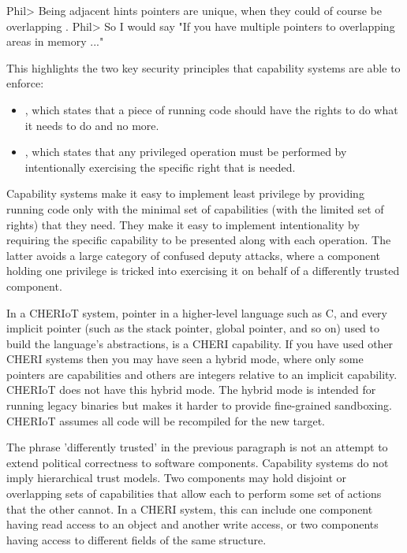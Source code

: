 Phil> Being adjacent hints pointers are unique, when they could of course be overlapping .
Phil> So I would say "If you have multiple pointers to overlapping areas in memory ..."  

This highlights the two key security principles that capability systems are able to enforce:

\begin{itemize}
	\item{, which states that a piece of running code should have the rights to do what it needs to do and no more.}
	\item{, which states that any privileged operation must be performed by intentionally exercising the specific right that is needed.}
\end{itemize}

Capability systems make it easy to implement least privilege by providing running code only with the minimal set of capabilities (with the limited set of rights) that they need.
They make it easy to implement intentionality by requiring the specific capability to be presented along with each operation.
The latter avoids a large category of confused deputy attacks, where a component holding one privilege is tricked into exercising it on behalf of a differently trusted component.

\begin{note}
	In a CHERIoT system,  pointer in a higher-level language such as C, and every implicit pointer (such as the stack pointer, global pointer, and so on) used to build the language's abstractions, is a CHERI capability.
	If you have used other CHERI systems then you may have seen a hybrid mode, where only some pointers are capabilities and others are integers relative to an implicit capability.
	CHERIoT does not have this hybrid mode.
	The hybrid mode is intended for running legacy binaries but makes it harder to provide fine-grained sandboxing.
	CHERIoT assumes all code will be recompiled for the new target.
\end{note}

The phrase 'differently trusted' in the previous paragraph is not an attempt to extend political correctness to software components.
Capability systems do not imply hierarchical trust models.
Two components may hold disjoint or overlapping sets of capabilities that allow each to perform some set of actions that the other cannot.
In a CHERI system, this can include one component having read access to an object and another write access, or two components having access to different fields of the same structure.

